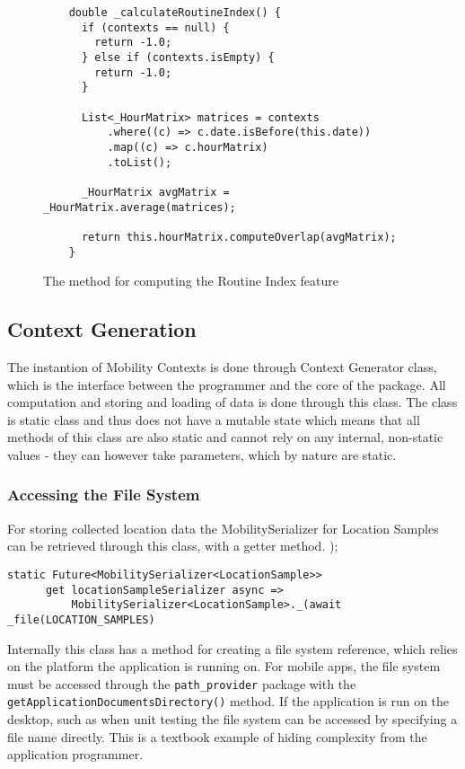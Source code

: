 \begin{figure}
    \centering
    \begin{verbatim}
    double _calculateRoutineIndex() {
      if (contexts == null) {
        return -1.0;
      } else if (contexts.isEmpty) {
        return -1.0;
      }
    
      List<_HourMatrix> matrices = contexts
          .where((c) => c.date.isBefore(this.date))
          .map((c) => c.hourMatrix)
          .toList();
    
      _HourMatrix avgMatrix = _HourMatrix.average(matrices);
    
      return this.hourMatrix.computeOverlap(avgMatrix);
    }
    \end{verbatim}
    \caption{The method for computing the Routine Index feature}
    \label{fig:routine-index-code}
\end{figure}

\subsection{Context Generation}
The instantion of Mobility Contexts is done through Context Generator class, which is the interface between the programmer and the core of the package. All computation and storing and loading of data is done through this class. The class is static class and thus does not have a mutable state which means that all methods of this class are also static and cannot rely on any internal, non-static values - they can however take parameters, which by nature are static. 

\subsubsection{Accessing the File System}
For storing collected location data the MobilitySerializer for Location Samples can be retrieved through this class, with a getter method. 
);
\begin{verbatim}
static Future<MobilitySerializer<LocationSample>>
      get locationSampleSerializer async =>
          MobilitySerializer<LocationSample>._(await _file(LOCATION_SAMPLES)
\end{verbatim}

Internally this class has a method for creating a file system reference, which relies on the platform the application is running on. For mobile apps, the file system must be accessed through the \verb|path_provider| package with the \verb|getApplicationDocumentsDirectory()| method. If the application is run on the desktop, such as when unit testing the file system can be accessed by specifying a file name directly. This is a textbook example of hiding complexity from the application programmer.


